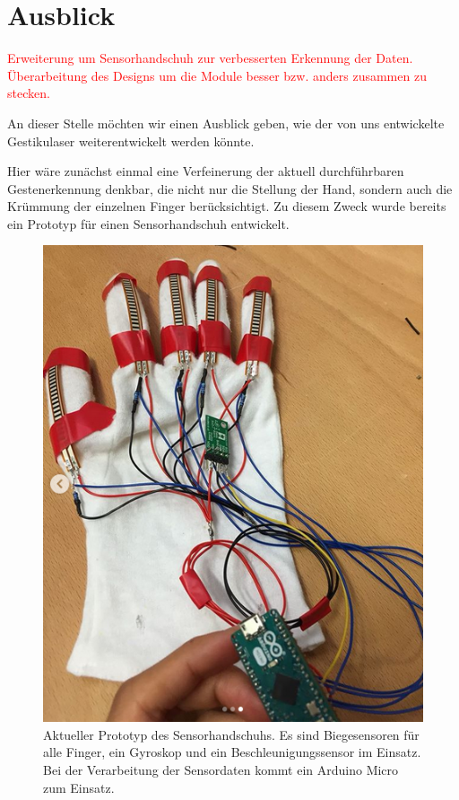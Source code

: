 \chapter{Ausblick}
\label{ch:Ausblick}

\textcolor{red}{Erweiterung um Sensorhandschuh zur verbesserten Erkennung der Daten. Überarbeitung des Designs um die Module besser bzw. anders zusammen zu stecken.}

An dieser Stelle möchten wir einen Ausblick geben, wie der von uns entwickelte Gestikulaser  weiterentwickelt werden könnte. 

Hier wäre zunächst einmal eine Verfeinerung der aktuell durchführbaren Gestenerkennung denkbar, die nicht nur die Stellung der Hand, sondern auch die Krümmung der einzelnen Finger berücksichtigt. Zu diesem Zweck wurde bereits ein Prototyp für einen Sensorhandschuh entwickelt. 

\begin{figure}[h]
	\centering
	\includegraphics[scale=0.75]{figures/Sensorhandschuh}
	\caption{Aktueller Prototyp des Sensorhandschuhs. Es sind Biegesensoren für alle Finger, ein Gyroskop und ein Beschleunigungssensor im Einsatz. Bei der  
	Verarbeitung der Sensordaten kommt ein Arduino Micro zum Einsatz.}
	\label{fig:Sensorhandschuh}
\end{figure}

